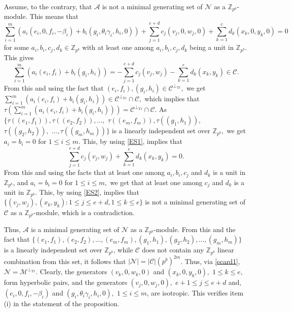 \documentclass{article}
\DeclareMathOperator{\Tr}{Tr}
\theoremstyle{remark}
\theoremstyle{definition}
\numberwithin{equation}{section}
\begin{document}
Assume, to the contrary, that $\mathcal{A}$ is not a minimal generating set of $\mathcal{N}$ as a $\mathbb{Z}_{p^b}$-module. This means that
$$\sum \limits_{i=1}^{m} (a_i (e_i,0,f_i,-\beta_{i})+b_i (g_i,\theta_i\gamma_{i},h_i,0))+\sum \limits_{j=1}^{e+d}  c_j (v_{j},0,w_{j},0) +\sum \limits_{k=1}^{e} d_k (x_k,0,y_k,0) =0 $$
for some $a_i,b_i,c_j,d_k \in \mathbb{Z}_{p^b}$ with at least one among $a_i,b_i,c_j,d_k$ being a unit in $\mathbb{Z}_{p^b}.$
This gives
\begin{equation}\label{ES1}
\sum \limits_{i=1}^{m} (a_i (e_i,f_i)+b_i (g_i,h_i)) = -\sum \limits_{j=1}^{e+d}  c_j (v_{j},w_{j}) -\sum \limits_{k=1}^{e} d_k (x_k,y_k) \in \mathcal{C}.
\end{equation}
From this and using the fact that $(e_i,f_i), (g_i,h_i) \in \mathcal{C}^{\perp_{\Tr}},$ we get $\sum \limits_{i=1}^{m} (a_i (e_i,f_i)+b_i (g_i,h_i)) \in \mathcal{C}^{\perp_{\Tr}} \cap \mathcal{C},$ which implies that $\tau(\sum \limits_{i=1}^{m} (a_i (e_i,f_i)+b_i (g_i,h_i)))=\mathcal{C}^{\perp_{\Tr}} \cap \mathcal{C}.$ As $\{\tau((e_1,f_1)),\tau((e_2,f_2)),\ldots, $ $\tau((e_{m},f_{m})),\tau((g_1,h_1)),$ $\tau((g_2,h_2)),$ $\ldots, \tau((g_{m},h_{m}))\}$ is a linearly independent set over $\mathbb{Z}_{p^b},$ we get $a_i=b_i=0$ for $1 \leq i \leq m.$ This, by using \eqref{ES1}, implies that 
\begin{equation}\label{ES2}
\sum \limits_{j=1}^{e+d}  c_j (v_{j},w_{j}) +\sum \limits_{k=1}^{e} d_k (x_k,y_k)=0.
\end{equation}
%
From this and using the facts that at least one among $a_i,b_i,c_j$ and $d_k$ is a unit in $\mathbb{Z}_{p^b}$, and $a_i=b_i=0$ for $1 \leq i \leq m,$ we get that at least one among $c_j$ and $d_k$ is a unit in $\mathbb{Z}_{p^b}$. This, by using \eqref{ES2}, implies that $\{  (v_{j},w_{j}),(x_k,y_k) : 1 \leq j \leq e+d ,  1\leq  k \leq e\}$ is not a minimal generating set of $\mathcal{C}$ as a $\mathbb{Z}_{p^b}$-module, which is a contradiction. 

Thus, $\mathcal{A}$ is a minimal generating set of $\mathcal{N}$ as a $\mathbb{Z}_{p^b}$-module. From this and the fact that $\{(e_1,f_1),(e_2,f_2),\ldots, (e_{m},f_{m}),(g_1,h_1),(g_2,h_2),\ldots, (g_{m},h_{m})\}$ is a linearly independent set over $\mathbb{Z}_{p^b}$, while $\mathcal{C}$ does not contain any $\mathbb{Z}_{p^b}$ linear combination from this set, it follows that $|\mathcal{N}|=|\mathcal{C}|(p^{b})^{2m}$. Thus, via \eqref{ecard1}, $\mathcal{N} =\mathcal{M}^{\perp_{\Tr}}$. Clearly, the generators $(v_{k},0,w_{k},0)$ and $(x_k,0,y_k,0),$  $1\leq  k \leq e$, form hyperbolic pairs, and the generators $(v_{j},0,w_{j},0),$ $e+1 \leq j \leq e+d$ and, $(e_i,0,f_i,-\beta_{i})$ and $(g_i,\theta_i\gamma_{i},h_i,0),$  $1 \leq i \leq m$, are isotropic. This verifies item (i) in the statement of the proposition.
\end{document}
